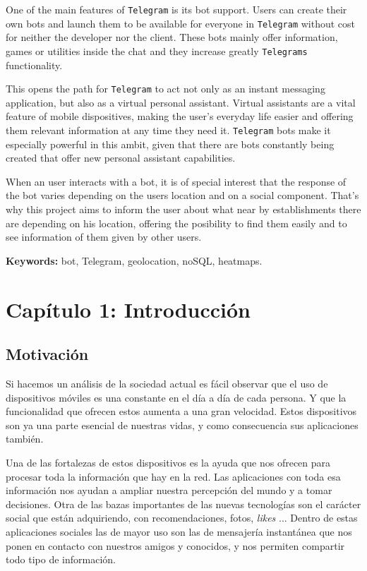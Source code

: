 \documentclass[oneside]{memoir}
\newcommand{\mychapter}[2]{
    \setcounter{chapter}{#1}
    \setcounter{section}{0}
    \chapter*{#2}
    \addcontentsline{toc}{chapter}{#2}
}
\begin{document}
One of the main features of \texttt{Telegram} is its bot support. Users can create their own bots and launch them to be available for everyone in \texttt{Telegram} without cost for neither the developer nor the client. These bots mainly offer information, games or utilities inside the chat and they increase greatly \texttt{Telegrams} functionality.

This opens the path for \texttt{Telegram} to act not only as an instant messaging application, but also as a virtual personal assistant. Virtual assistants are a vital feature of mobile dispositives, making the user's everyday life easier and offering them relevant information at any time they need it. \texttt{Telegram} bots make it especially powerful in this ambit, given that there are bots constantly being created that offer new personal assistant capabilities.

When an user interacts with a bot, it is of special interest that the response of the bot varies depending on the users location and on a social component. That's why this project aims to inform the user about what near by establishments there are depending on his location, offering the posibility to find them easily and to see information of them given by other users.

\bigbreak
{\Large\textbf{Keywords:} bot, Telegram, geolocation, noSQL, heatmaps.}

\newpage
{}

\mychapter{1}{Cap\'itulo 1: Introducci\'on}
\section{Motivaci\'on}
Si hacemos un análisis de la sociedad actual es fácil observar que el uso de dispositivos móviles es una constante en el día a día de cada persona. Y que la funcionalidad que ofrecen estos aumenta a una gran velocidad. Estos dispositivos son ya una parte esencial de nuestras vidas, y como consecuencia sus aplicaciones también.

Una de las fortalezas de estos dispositivos es la ayuda que nos ofrecen para procesar toda la información que hay en la red. Las aplicaciones con toda esa información nos ayudan a ampliar nuestra percepción del mundo y a tomar decisiones. Otra de las bazas importantes de las nuevas tecnologías son el carácter social que están adquiriendo, con recomendaciones, fotos, \textit{likes} ... Dentro de estas aplicaciones sociales las de mayor uso son las de mensajería instantánea que nos ponen en contacto con nuestros amigos y conocidos, y nos permiten compartir todo tipo de información.
\end{document}
